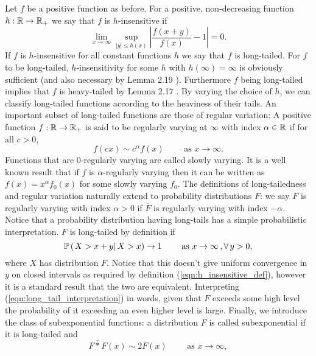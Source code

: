 Let $f$ be a positive function as before. For a positive, non-decreasing function $h:\mathbb{R} \to \mathbb{R}_+$ we say that $f$ is $h$-insensitive if 
\begin{equation}\label{eqn:h_insensitive_def}
\lim\limits_{x \to \infty} \sup\limits_{|y| \leq h(x)} \left\lvert \frac{f(x+y)}{f(x)} - 1 \right\rvert = 0. 
\end{equation}
If $f$ is $h$-insensitive for all constant functions $h$ we say that $f$ is long-tailed. For $f$ to be long-tailed, $h$-insensitivity for some $h$ with $h(\infty) = \infty$ is obviously sufficient (and also necessary by Lemma 2.19 \cite{foss2011introduction}). Furthermore $f$ being long-tailed implies that $f$ is heavy-tailed by Lemma 2.17 \cite{foss2011introduction}. By varying the choice of $h$, we can classify long-tailed functions according to the heaviness of their tails. An important subset of long-tailed functions are those of regular variation: A positive function $f:\mathbb{R} \to \mathbb{R}_+$ is said to be regularly varying at $\infty$ with index $\alpha \in \mathbb{R}$ if for all $c > 0$, 
\begin{equation}
f(cx) \sim c^\alpha f(x) \qquad\text{ as } x \to \infty. 
\end{equation}
Functions that are $0$-regularly varying are called slowly varying. It is a well known result that if $f$ is $\alpha$-regularly varying then it can be written as $f(x) = x^\alpha f_0(x)$ for some slowly varying $f_0$. The definitions of long-tailedness and regular variation naturally extend to probability distributions $F$: we say $F$ is regularly varying with index $\alpha > 0$ if $\overline{F}$ is regularly varying with index $- \alpha$. Notice that a probability distribution having long-tails has a simple probabilistic interpretation. $F$ is long-tailed by definition if 
\begin{equation}\label{eqn:long_tail_interpretation}
\mathbb{P} \left( \left. X > x + y \right| X > x \right) \to 1 \qquad\text{ as } x \to \infty\,, \forall\, y > 0, 
\end{equation}
where $X$ has distribution $F$. Notice that this doesn't give uniform convergence in $y$ on closed intervals as required by definition (\ref{eqn:h_insensitive_def}), however it is a standard result that the two are equivalent. Interpreting (\ref{eqn:long_tail_interpretation}) in words, given that $F$ exceeds some high level the probability of it exceeding an even higher level is large. Finally, we introduce the class of subexponential functions: a distribution $F$ is called subexponential if it is long-tailed and 
\begin{equation}\label{eqn:subexponential_def}
\overline{F * F} (x) \sim 2 \overline{F}(x) \qquad\text{ as } x \to \infty, 
\end{equation}
